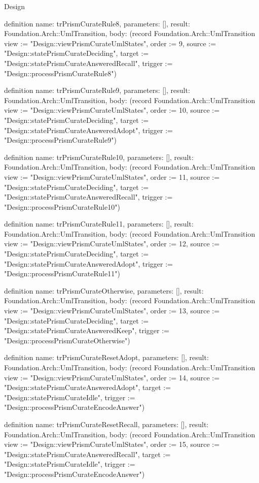\begin{lexlean}{Design}
\begin{semanticmodule}
definition{
  name: trPrismCurateRule8,
  parameters: [],
  result: Foundation.Arch::UmlTransition,
  body: (record Foundation.Arch::UmlTransition {view := "Design::viewPrismCurateUmlStates", order := 9, source := "Design::statePrismCurateDeciding", target := "Design::statePrismCurateAnsweredRecall", trigger := "Design::processPrismCurateRule8"})
}

definition{
  name: trPrismCurateRule9,
  parameters: [],
  result: Foundation.Arch::UmlTransition,
  body: (record Foundation.Arch::UmlTransition {view := "Design::viewPrismCurateUmlStates", order := 10, source := "Design::statePrismCurateDeciding", target := "Design::statePrismCurateAnsweredAdopt", trigger := "Design::processPrismCurateRule9"})
}

definition{
  name: trPrismCurateRule10,
  parameters: [],
  result: Foundation.Arch::UmlTransition,
  body: (record Foundation.Arch::UmlTransition {view := "Design::viewPrismCurateUmlStates", order := 11, source := "Design::statePrismCurateDeciding", target := "Design::statePrismCurateAnsweredRecall", trigger := "Design::processPrismCurateRule10"})
}

definition{
  name: trPrismCurateRule11,
  parameters: [],
  result: Foundation.Arch::UmlTransition,
  body: (record Foundation.Arch::UmlTransition {view := "Design::viewPrismCurateUmlStates", order := 12, source := "Design::statePrismCurateDeciding", target := "Design::statePrismCurateAnsweredAdopt", trigger := "Design::processPrismCurateRule11"})
}

definition{
  name: trPrismCurateOtherwise,
  parameters: [],
  result: Foundation.Arch::UmlTransition,
  body: (record Foundation.Arch::UmlTransition {view := "Design::viewPrismCurateUmlStates", order := 13, source := "Design::statePrismCurateDeciding", target := "Design::statePrismCurateAnsweredKeep", trigger := "Design::processPrismCurateOtherwise"})
}

definition{
  name: trPrismCurateResetAdopt,
  parameters: [],
  result: Foundation.Arch::UmlTransition,
  body: (record Foundation.Arch::UmlTransition {view := "Design::viewPrismCurateUmlStates", order := 14, source := "Design::statePrismCurateAnsweredAdopt", target := "Design::statePrismCurateIdle", trigger := "Design::processPrismCurateEncodeAnswer"})
}

definition{
  name: trPrismCurateResetRecall,
  parameters: [],
  result: Foundation.Arch::UmlTransition,
  body: (record Foundation.Arch::UmlTransition {view := "Design::viewPrismCurateUmlStates", order := 15, source := "Design::statePrismCurateAnsweredRecall", target := "Design::statePrismCurateIdle", trigger := "Design::processPrismCurateEncodeAnswer"})
}


\end{semanticmodule}
\end{lexlean}
